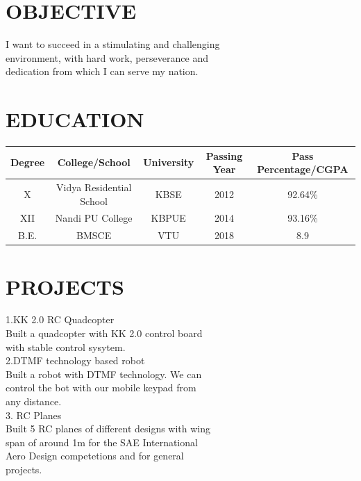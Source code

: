 \documentclass[10pt]{article}
\begin{document}
\raggedright
\section*{\large{OBJECTIVE}}
\hspace{2in} \large{I want to succeed in a stimulating and challenging \\\hspace{2.05in}environment, with hard work, perseverance and \\\hspace{2.05in}dedication from which I can serve my nation. }

\raggedright
\section*{\large{EDUCATION}}
\hspace{2in} \small\begin{tabular}{|c|c|c|c|c|}
\hline
\textbf{Degree} & \textbf{College/School} & \textbf{University} & \textbf{Passing Year} & \textbf{Pass Percentage/CGPA} \\
\hline
X & Vidya Residential School & KBSE & 2012 & 92.64\%\\
\hline
XII & Nandi PU College & KBPUE & 2014 & 93.16\% \\
\hline
B.E. & BMSCE  & VTU & 2018 & 8.9 \\
\hline
\end{tabular}

\raggedright
\section*{\large{PROJECTS}}
\hspace{2in} \large{1.KK 2.0 RC Quadcopter} \\
\hspace{2.5in} \large{Built a quadcopter with KK 2.0 control board\\\hspace{2.5in} with stable control sysytem.} \\
\hspace{2in} 2.DTMF technology based robot \\
\hspace{2.5in} \large{Built a robot with DTMF technology. We can\\\hspace{2.5in} control the bot with our mobile keypad from\\\hspace{2.5in} any distance. } \\
\hspace{2in} 3. RC Planes  \\
\hspace{2.5in} \large{Built 5 RC planes of different designs with wing \\\hspace{2.58in}span of around 1m  for the SAE International\\\hspace{2.5in} Aero Design competetions and for general \\\hspace{2.58in}projects. } \\
 
\end{document}
